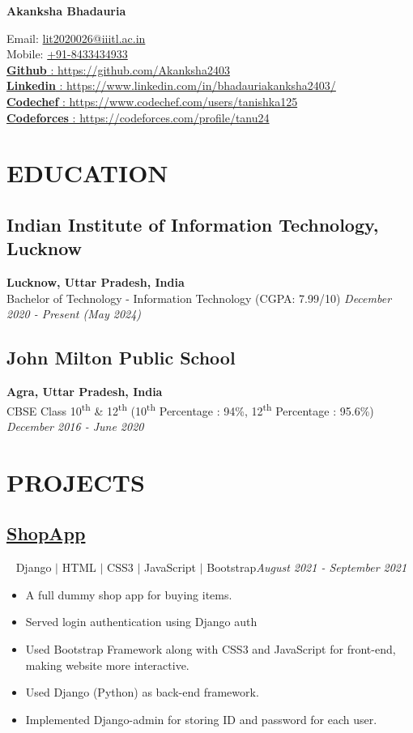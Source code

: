 \documentclass[12pt]{article}
\newcommand{\resumename}[1]{\LARGE\textbf{#1} \hfill \small}
\begin{document}
\noindent
\resumename{Akanksha Bhadauria} \raggedright Email: \href{mailto:lit2020026@iiitl.ac.in}{lit2020026@iiitl.ac.in} \\
\hfill Mobile: \href{tel:+918433434933}{+91-8433434933}\\
\href{https://github.com/Akanksha2403}{\textbf{Github} : https://github.com/Akanksha2403} \\
\href{https://www.linkedin.com/in/bhadauriakanksha2403/}{\textbf{Linkedin} : https://www.linkedin.com/in/bhadauriakanksha2403/} \\
\href{https://www.codechef.com/users/tanishka125}{\textbf{Codechef} : https://www.codechef.com/users/tanishka125} \\
\href{https://codeforces.com/profile/tanu24}{\textbf{Codeforces} : https://codeforces.com/profile/tanu24} 
\section*{EDUCATION}
\subsection*{Indian Institute of Information Technology, Lucknow}      \hfill \textbf{Lucknow, Uttar Pradesh, India} \\
Bachelor of Technology - Information Technology (CGPA: 7.99/10) \hfill \textit{December 2020 - Present (May 2024)} \\
\subsection*{John Milton Public School}                       \hfill \textbf{Agra, Uttar Pradesh, India} \\
CBSE Class 10\textsuperscript{th} \& 12\textsuperscript{th} (10\textsuperscript{th} Percentage : 94\%, 12\textsuperscript{th} Percentage : 95.6\%) \hfill \textit{December 2016 - June 2020} \\ 

\section*{PROJECTS}
\subsection*{\href{https://akanksha2403.pythonanywhere.com/}{ShopApp}}~ Django $\vert$ HTML $\vert$ CSS3 $\vert$ JavaScript $\vert$ Bootstrap\hfill \textit{August 2021 - September 2021} \\ 
\begin{itemize}[topsep=0pt,itemsep=1pt,partopsep=1pt, parsep=1pt]
    \item A full dummy shop app for buying items. 
    \item Served login authentication using Django auth
    \item Used Bootstrap Framework along with CSS3 and JavaScript for front-end, making website more interactive.
    \item Used Django (Python) as back-end framework. 
    \item Implemented Django-admin for storing ID and password for each user. 
\end{itemize}
\end{document}
